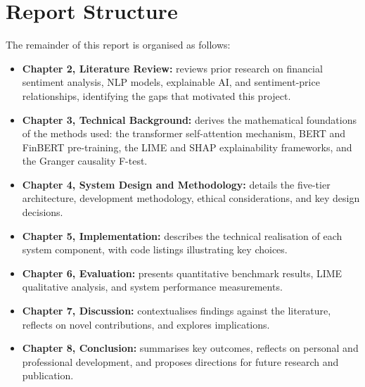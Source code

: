 \begin{enumerate}
\end{enumerate}

\section{Report Structure}

The remainder of this report is organised as follows:

\begin{itemize}
    \item \textbf{Chapter 2, Literature Review:} reviews prior research on
    financial sentiment analysis, NLP models, explainable AI, and
    sentiment-price relationships, identifying the gaps that motivated this
    project.
    \item \textbf{Chapter 3, Technical Background:} derives the mathematical
    foundations of the methods used: the transformer self-attention mechanism,
    BERT and FinBERT pre-training, the LIME and SHAP explainability frameworks,
    and the Granger causality F-test.
    \item \textbf{Chapter 4, System Design and Methodology:} details the
    five-tier architecture, development methodology, ethical considerations, and
    key design decisions.
    \item \textbf{Chapter 5, Implementation:} describes the technical
    realisation of each system component, with code listings illustrating
    key choices.
    \item \textbf{Chapter 6, Evaluation:} presents quantitative benchmark
    results, LIME qualitative analysis, and system performance measurements.
    \item \textbf{Chapter 7, Discussion:} contextualises findings against the
    literature, reflects on novel contributions, and explores implications.
    \item \textbf{Chapter 8, Conclusion:} summarises key outcomes, reflects on
    personal and professional development, and proposes directions for future
    research and publication.
\end{itemize}
